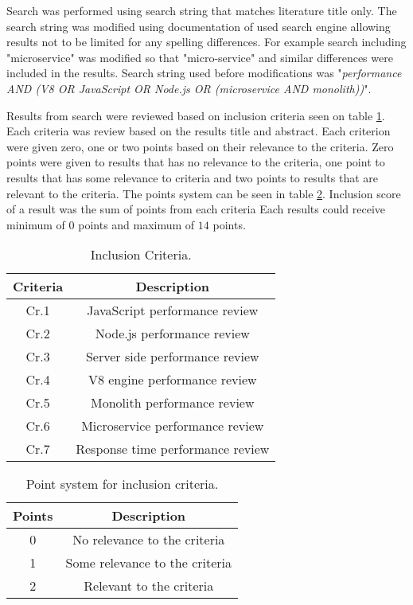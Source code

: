 Search was performed using search string that matches literature title only.
The search string was modified using documentation of used search engine allowing results not to be limited for any spelling differences.
For example search including "microservice" was modified so that "micro-service" and similar differences were included in the results.
Search string used before modifications was "\textit{performance AND (V8 OR JavaScript OR Node.js OR (microservice AND monolith))}".

Results from search were reviewed based on inclusion criteria seen on table \ref{table:literature:inclusionCriteria}.
Each criteria was review based on the results title and abstract.
Each criterion were given zero, one or two points based on their relevance to the criteria.
Zero points were given to results that has no relevance to the criteria, one point to results that has some relevance to criteria and two points to results that are relevant to the criteria.
The points system can be seen in table \ref{table:literature:pointSystem}.
Inclusion score of a result was the sum of points from each criteria
Each results could receive minimum of $0$ points and maximum of $14$ points.

\begin{table}[h!]
    \begin{tabular}{|c c|} 
        \hline
        Criteria & Description \\ [0.5ex] 
        \hline
        Cr.1 & JavaScript performance review
        \\ 
        \hline
        Cr.2 & Node.js performance review  \\ 
        \hline
        Cr.3 & Server side performance review  \\ 
        \hline
        Cr.4 & V8 engine performance review  \\ 
        \hline
        Cr.5 & Monolith performance review  \\ 
        \hline
        Cr.6 & Microservice performance review  \\ 
        \hline
        Cr.7 & Response time performance review  \\ 
        \hline
    \end{tabular}    
    \caption{Inclusion Criteria.}
    \label{table:literature:inclusionCriteria}
\end{table}

\begin{table}[h!]
    \begin{tabular}{|c c|}
        \hline
        Points & Description \\ [0.5ex] 
        \hline
         0 & No relevance to the criteria  \\ 
        \hline
         1 & Some relevance to the criteria \\ 
        \hline
        2 & Relevant to the criteria \\ 
        \hline
    \end{tabular}
    \caption{Point system for inclusion criteria.}
    \label{table:literature:pointSystem}
\end{table}

